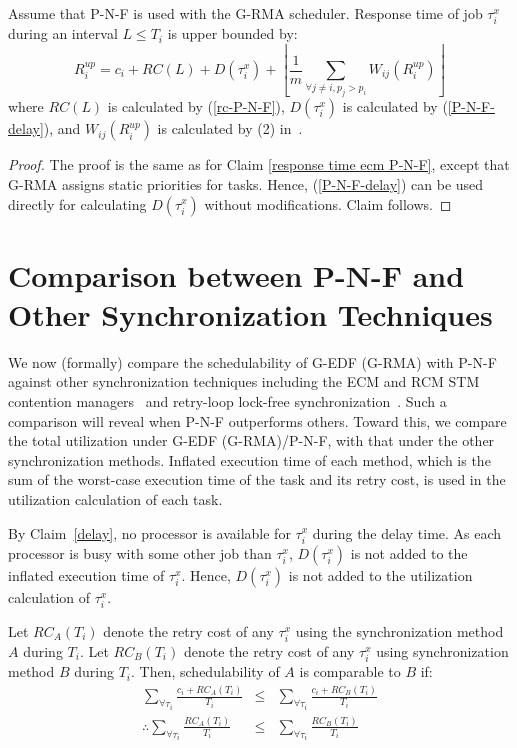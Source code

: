 \begin{clm}\label{response rcm P-N-F}
Assume that P-N-F is used with the G-RMA scheduler. Response
time of job $\tau_{i}^{x}$ during an interval $L\le T_{i}$ is upper
bounded by: 
\begin{equation}
R_{i}^{up}=c_{i}+RC(L)+D(\tau_{i}^{x})+\left\lfloor \frac{1}{m}\sum_{\forall j\ne i,p_j>p_i}W_{ij}(R_{i}^{up})\right\rfloor 
\end{equation}
where $RC(L)$ is calculated by (\ref{rc-P-N-F}), $D(\tau_{i}^{x})$
is calculated by (\ref{P-N-F-delay}), and $W_{ij}(R_{i}^{up})$
is calculated by (2) in~\cite{stmconcurrencycontrol:emsoft11}.
\end{clm}
\begin{proof}
The proof is the same as for Claim \ref{response time ecm P-N-F}, 
except that G-RMA assigns static priorities for tasks. Hence, (\ref{P-N-F-delay}) can be used directly for calculating $D(\tau_{i}^{x})$ without modifications. Claim follows.
\end{proof}


\section{Comparison between P-N-F and Other Synchronization Techniques}
\label{sec:pnf-sched-comparison}

We now (formally) compare the schedulability of G-EDF (G-RMA) with P-N-F against other synchronization techniques including the ECM and RCM STM contention managers~\cite{stmconcurrencycontrol:emsoft11} and retry-loop lock-free synchronization~\cite{stmconcurrencycontrol:emsoft11,key-5}. 
Such a comparison will reveal when P-N-F outperforms  others. 
Toward this, we compare the total utilization under G-EDF (G-RMA)/P-N-F,  with that under the other synchronization methods.
Inflated execution time of each method, which is the sum of the worst-case execution time of the task and its retry cost, is used in the utilization calculation of each task.

By Claim~\ref{delay}, no processor is available for $\tau_i^x$ during the delay time. As each processor is busy with some other job than $\tau_i^x$, $D(\tau_i^x)$ is not added to the inflated execution time of $\tau_i^x$. Hence, $D(\tau_i^x)$ is not added to the utilization calculation of $\tau_i^x$.

Let $RC_{A}(T_{i})$ denote the retry cost of any $\tau_i^x$ using the synchronization method $A$ during $T_i$. Let $RC_{B}(T_{i})$ denote the  retry cost of any $\tau_i^x$ using synchronization method $B$ during $T_i$. Then, schedulability of $A$ is comparable to $B$ if:
\begin{eqnarray}
\sum_{\forall\tau_{i}}\frac{c_{i}+RC_{A}(T_{i})}{T_{i}} & \le & \sum_{\forall\tau_{i}}\frac{c_{i}+RC_{B}(T_{i})}{T_{i}}\nonumber \\
\therefore\sum_{\forall\tau_{i}}\frac{RC_{A}(T_{i})}{T_{i}} & \le & \sum_{\forall\tau_{i}}\frac{RC_{B}(T_{i})}{T_{i}}\label{utilization comparison}
\end{eqnarray}


